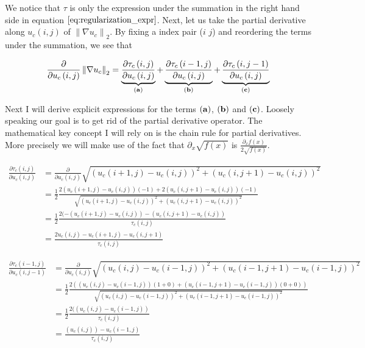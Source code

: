 \documentclass{paper}
\newcommand{\norm}[1]{\left\lVert#1\right\rVert}
\begin{document}
We notice that $\tau$ is only the expression under the summation in the right hand side in equation $\ref{eq:regularization_expr}$. Next, let us take the partial derivative along $u_{c}(i,j)$ of $\norm{\nabla{u_{c}}}_2$. By fixing a index pair ($i$ $j$) and reordering the terms under the summation, we see that 

\begin{equation}
	\frac{\partial}{\partial u_{c}\left(i,j\right)} \norm{\nabla{u_c}}_2 = \underbrace{\frac{\partial{\tau_{c}\left(i,j\right)}}{\partial u_{c}\left(i,j\right)}}_{\bf{(a)}} + \underbrace{\frac{\partial{\tau_{c}\left(i-1,j\right)}}{\partial u_{c}\left(i,j\right)}}_{\bf{(b)}} + \underbrace{\frac{\partial{\tau_{c}\left(i,j-1\right)}}{\partial u_{c}\left(i,j\right)}}_{\bf{(c)}}
\end{equation}

Next I will derive explicit expressions for the terms $\bf{(a)}$, $\bf{(b)}$ and $\bf{(c)}$. Loosely speaking our goal is to get rid of the partial derivative operator. The mathematical key concept I will rely on is the chain rule for partial derivatives. More precisely we will make use of the fact that $\partial_{x}\sqrt{f(x)}$ is $\frac{\partial_{x} f(x)}{2 \sqrt{f(x)}}$.

\begin{align}
	\frac{\partial{\tau_{c}\left(i,j\right)}}{\partial u_{c}\left(i,j\right)}
	&= \frac{\partial}{\partial{u_{c}\left(i,j\right)}} \sqrt{ \left(u_{c}(i+1,j) - u_{c}(i,j)\right)^2 + \left(u_{c}(i,j+1) - u_{c}(i,j)\right)^2} \\
	&= \frac{1}{2} \frac{2 (u_{c}(i+1,j)-u_{c}(i,j))(-1) + 2 (u_{c}(i,j+1)-u_{c}(i,j))(-1)}{\sqrt{ \left(u_{c}(i+1,j) - u_{c}(i,j)\right)^2 + \left(u_{c}(i,j+1) - u_{c}(i,j)\right)^2}} \\
	&= \frac{1}{2} \frac{2 (-(u_{c}(i+1,j)-u_{c}(i,j)) - (u_{c}(i,j+1)-u_{c}(i,j))}{\tau_{c}\left(i,j\right)} \\
	&= \frac{2 u_{c} \left(i,j\right) - u_{c} \left(i+1,j\right)-u_{c} \left(i,j+1\right)}{\tau_{c}\left(i,j\right)}
\end{align}

\begin{align}
	\frac{\partial{\tau_{c}\left(i-1,j\right)}}{\partial u_{c}\left(i,j-1\right)}
	&= \frac{\partial}{\partial{u_{c}\left(i,j\right)}} \sqrt{ \left(u_{c}(i,j) - u_{c}(i-1,j)\right)^2 + \left(u_{c}(i-1,j+1) - u_{c}(i-1,j)\right)^2} \\
	&= \frac{1}{2} \frac{2(\left(u_{c}(i,j) - u_{c}(i-1,j)\right)(1+0) + \left(u_{c}(i-1,j+1) - u_{c}(i-1,j)\right)(0+0))}{\sqrt{ \left(u_{c}(i,j) - u_{c}(i-1,j)\right)^2 + \left(u_{c}(i-1,j+1) - u_{c}(i-1,j)\right)^2}} \\
	&= \frac{1}{2} \frac{2(\left(u_{c}(i,j) - u_{c}(i-1,j)\right)}{\tau_{c}\left(i,j\right)} \\
	&= \frac{\left(u_{c}(i,j)\right)-u_{c} \left(i-1,j\right)}{\tau_{c}\left(i,j\right)}
\end{align}
\end{document}
